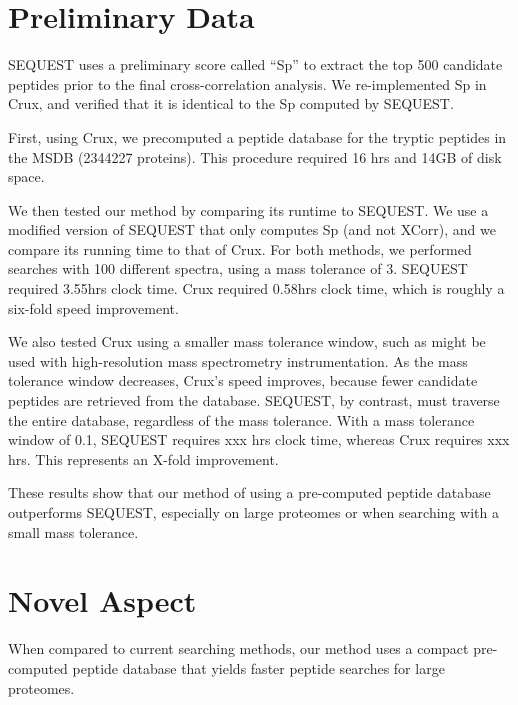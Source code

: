 \documentclass[12pt]{article}
\begin{document}
\section{Preliminary Data}

SEQUEST uses a preliminary score called ``Sp'' to extract the top 500
candidate peptides prior to the final cross-correlation analysis.
We re-implemented Sp in Crux, and verified that it is identical to the
Sp computed by SEQUEST.


First, using Crux, we precomputed a peptide database for the tryptic
peptides in the MSDB (2344227 proteins).  This procedure required 16
hrs and 14GB of disk space.

We then tested our method by comparing its runtime to SEQUEST.  We use
a modified version of SEQUEST that only computes Sp (and not XCorr),
and we compare its running time to that of Crux.  For both methods, we
performed searches with 100 different spectra, using a mass tolerance
of 3.  SEQUEST required 3.55hrs clock time. Crux required 0.58hrs clock time, 
which is roughly a six-fold speed improvement.

We also tested Crux using a smaller mass tolerance window, such
as might be used with high-resolution mass spectrometry
instrumentation.  As the mass tolerance window decreases, Crux's speed
improves, because fewer candidate peptides are retrieved from the
database.  SEQUEST, by contrast, must traverse the entire database,
regardless of the mass tolerance.  With a mass tolerance window of
0.1, SEQUEST requires xxx hrs clock time, whereas Crux requires xxx
hrs.  This represents an X-fold improvement.

These results show that our method of using a pre-computed peptide
database outperforms SEQUEST, especially on large proteomes or when
searching with a small mass tolerance.

\section{Novel Aspect}

When compared to current searching methods, our method uses a compact
pre-computed peptide database that yields faster peptide searches for
large proteomes.
\end{document}

